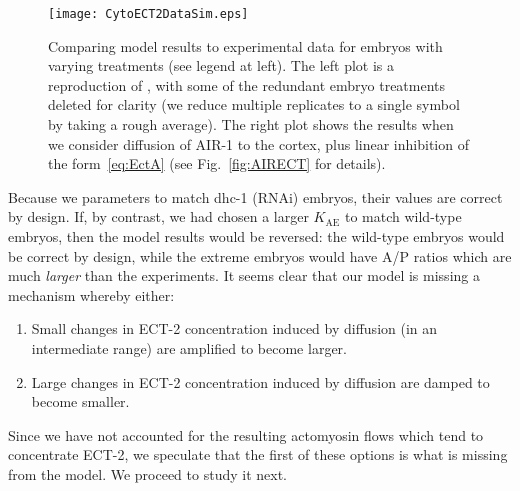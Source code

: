 \documentclass[11pt]{article}
\begin{document}
\begin{figure}
\centering
\texttt{[image: CytoECT2DataSim.eps]}
\caption{\label{fig:DiffCSep} Comparing model results to experimental data for embryos with varying treatments (see legend at left). The left plot is a reproduction of \cite[Fig.~7A]{longhini2022aurora}, with some of the redundant embryo treatments deleted for clarity (we reduce multiple replicates to a single symbol by taking a rough average). The right plot shows the results when we consider diffusion of AIR-1 to the cortex, plus linear inhibition of the form\ \eqref{eq:EctA} (see Fig.\ \ref{fig:AIRECT} for details).}
\end{figure}

Because we parameters to match dhc-1 (RNAi) embryos, their values are correct by design. If, by contrast, we had chosen a larger $K_\text{AE}$ to match wild-type embryos, then the model results would be reversed: the wild-type embryos would be correct by design, while the extreme embryos would have A/P ratios which are much \emph{larger} than the experiments. 
It seems clear that our model is missing a mechanism whereby either:
\begin{enumerate}
\item Small changes in ECT-2 concentration induced by diffusion (in an intermediate range) are amplified to become larger.
\item Large changes in ECT-2 concentration induced by diffusion are damped to become smaller.
\end{enumerate}
Since we have not accounted for the resulting actomyosin flows which tend to concentrate ECT-2, we speculate that the first of these options is what is missing from the model. We proceed to study it next.
\end{document}
